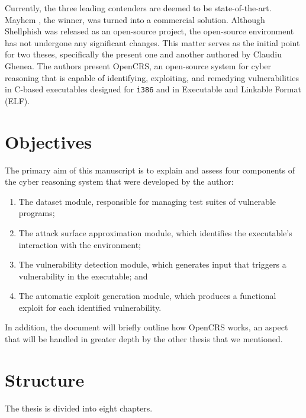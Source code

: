\documentclass[../main.tex]{subfiles}
\begin{document}
Currently, the three leading contenders are deemed to be
state-of-the-art. Mayhem \cite{mayhem}, the winner, was turned into a commercial
solution. Although Shellphish \cite{shellphish} was released as an open-source
project, the open-source environment has not undergone any
significant changes. This matter serves as the initial point for two
theses, specifically the present one and another \cite{ghenea} authored by Claudiu
Ghenea. The authors present OpenCRS, an open-source system for
cyber reasoning that is capable of identifying, exploiting, and
remedying vulnerabilities in C-based executables designed for
\texttt{i386} and in Executable and Linkable Format (ELF).

\hypertarget{objectives}{%
\section{Objectives}\label{objectives}}

The primary aim of this manuscript is to explain and assess four
components of the cyber reasoning system that were developed by the
author:

\begin{enumerate}
\def\labelenumi{\arabic{enumi}.}
\tightlist
\item
  The dataset module, responsible for managing test suites of vulnerable
  programs;
\item
  The attack surface approximation module, which identifies the
  executable's interaction with the environment;
\item
  The vulnerability detection module, which generates input that
  triggers a vulnerability in the executable; and
\item
  The automatic exploit generation module, which produces a functional
  exploit for each identified vulnerability.
\end{enumerate}

In addition, the document will briefly outline how OpenCRS works, an
aspect that will be handled in greater depth by the other thesis that we
mentioned.

\hypertarget{structure}{%
\section{Structure}\label{structure}}

The thesis is divided into eight chapters.
\end{document}
